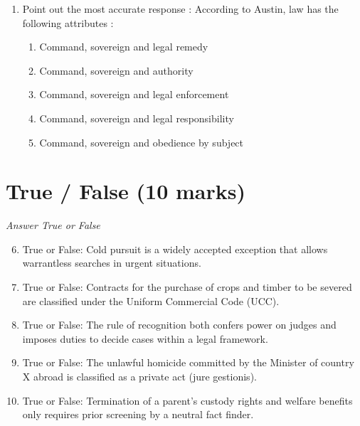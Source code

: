 \documentclass[12pt]{article}
\begin{document}
\begin{enumerate}[label=\arabic*.]
\begin{enumerate}[label=(\alph*)]
    \item The Nazi law in question was validly enacted.
    \item The Nazi rule of recognition was unclear.
    \item Hart agreed with Fuller's argument.
    \item The court misunderstood the legislation.
    \item Fuller misconstrued the purpose of the law.
\end{enumerate}
\item Point out the most accurate response : According to Austin, law has the following attributes :
\begin{enumerate}[label=(\alph*)]
    \item Command, sovereign and legal remedy
    \item Command, sovereign and authority
    \item Command, sovereign and legal enforcement
    \item Command, sovereign and legal responsibility
    \item Command, sovereign and obedience by subject
\end{enumerate}
\end{enumerate}

\section*{True / False (10 marks)}
\textit{Answer True or False}
\begin{enumerate}[label=\arabic*.]
\setcounter{enumi}{5}
\item True or False: Cold pursuit is a widely accepted exception that allows warrantless searches in urgent situations.
\item True or False: Contracts for the purchase of crops and timber to be severed are classified under the Uniform Commercial Code (UCC).
\item True or False: The rule of recognition both confers power on judges and imposes duties to decide cases within a legal framework.
\item True or False: The unlawful homicide committed by the Minister of country X abroad is classified as a private act (jure gestionis).
\item True or False: Termination of a parent's custody rights and welfare benefits only requires prior screening by a neutral fact finder.
\end{enumerate}
\end{document}
